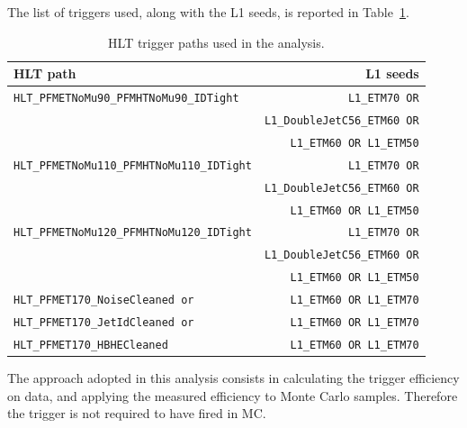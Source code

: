 The list of triggers used, along with the L1 seeds, is reported in Table~\ref{tab:trig_default}.

\begin{table}[!htb]
\centering
  \caption{HLT trigger paths used in the analysis.\label{tab:trig_default}}
 \begin{tabular}{l|r} 
 \hline
 HLT path & L1 seeds\\
 \hline
 \hline
 \texttt{HLT\_PFMETNoMu90\_PFMHTNoMu90\_IDTight} & \texttt{L1\_ETM70 OR} \\
& \texttt{L1\_DoubleJetC56\_ETM60 OR}\\
&  \texttt{L1\_ETM60 OR L1\_ETM50}\\
 \hline
 \texttt{HLT\_PFMETNoMu110\_PFMHTNoMu110\_IDTight} & \texttt{L1\_ETM70 OR} \\
& \texttt{L1\_DoubleJetC56\_ETM60 OR}\\
&  \texttt{L1\_ETM60 OR L1\_ETM50}\\
 \hline
 \texttt{HLT\_PFMETNoMu120\_PFMHTNoMu120\_IDTight} & \texttt{L1\_ETM70 OR} \\
& \texttt{L1\_DoubleJetC56\_ETM60 OR}\\
&  \texttt{L1\_ETM60 OR L1\_ETM50}\\
\hline
 \texttt{HLT\_PFMET170\_NoiseCleaned or} & \texttt{L1\_ETM60 OR L1\_ETM70}\\
\hline
 \texttt{HLT\_PFMET170\_JetIdCleaned or} & \texttt{L1\_ETM60 OR L1\_ETM70}\\
\hline
 \texttt{HLT\_PFMET170\_HBHECleaned} & \texttt{L1\_ETM60 OR L1\_ETM70}\\
 \hline
 \end{tabular}
\end{table}

The approach adopted in this analysis consists in calculating the trigger efficiency on data, and applying the measured efficiency to Monte Carlo samples. Therefore the trigger is not required to have fired in MC.

